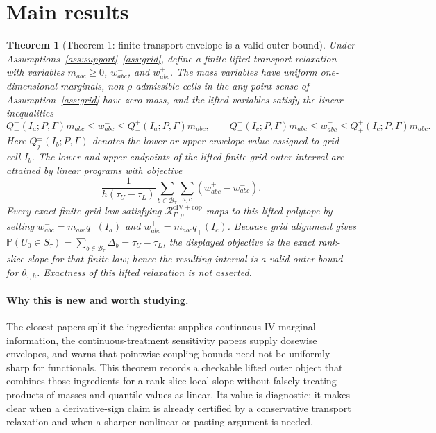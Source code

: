 \documentclass[11pt]{article}
\renewcommand{\Pr}{\mathbb{P}}
\theoremstyle{definition}
\theoremstyle{plain}
\newtheorem{theorem}{Theorem}
\theoremstyle{remark}
\begin{document}
\section{Main results}
\begin{theorem}[Theorem 1: finite transport envelope is a valid outer bound]\label{thm:transport-outer}
Under Assumptions~\ref{ass:support}--\ref{ass:grid}, define a finite lifted transport relaxation with variables \(m_{abc}\ge0\), \(w^-_{abc}\), and \(w^+_{abc}\).  The mass variables have uniform one-dimensional marginals, non-\(\rho\)-admissible cells in the any-point sense of Assumption~\ref{ass:grid} have zero mass, and the lifted variables satisfy the linear inequalities
\[
Q^-_-(I_a;P,\Gamma)m_{abc}\le w^-_{abc}\le Q^+_-(I_a;P,\Gamma)m_{abc},\qquad
Q^-_+(I_c;P,\Gamma)m_{abc}\le w^+_{abc}\le Q^+_+(I_c;P,\Gamma)m_{abc}.
\]
Here \(Q^\pm_j(I_b;P,\Gamma)\) denotes the lower or upper envelope value assigned to grid cell \(I_b\).
The lower and upper endpoints of the lifted finite-grid outer interval are attained by linear programs with objective
\[
\frac{1}{h(\tau_U-\tau_L)}
\sum_{b\in\mathcal B_\tau}\sum_{a,c}(w^+_{abc}-w^-_{abc}).
\]
Every exact finite-grid law satisfying \(\mathcal R_{\Gamma,\rho}^{\mathrm{cIV+cop}}\) maps to this lifted polytope by setting \(w^-_{abc}=m_{abc}q_-(I_a)\) and \(w^+_{abc}=m_{abc}q_+(I_c)\).  Because grid alignment gives \(\Pr(U_0\in S_\tau)=\sum_{b\in\mathcal B_\tau}\Delta_b=\tau_U-\tau_L\), the displayed objective is the exact rank-slice slope for that finite law; hence the resulting interval is a valid outer bound for \(\theta_{\tau,h}\).  Exactness of this lifted relaxation is not asserted.
\end{theorem}

\paragraph{Why this is new and worth studying.}
The closest papers split the ingredients: \citet{Kasy2014} supplies continuous-IV marginal information, the continuous-treatment sensitivity papers supply dosewise envelopes, and \citet{FirpoRidder2019} warns that pointwise coupling bounds need not be uniformly sharp for functionals.  This theorem records a checkable lifted outer object that combines those ingredients for a rank-slice local slope without falsely treating products of masses and quantile values as linear.  Its value is diagnostic: it makes clear when a derivative-sign claim is already certified by a conservative transport relaxation and when a sharper nonlinear or pasting argument is needed.
\end{document}
